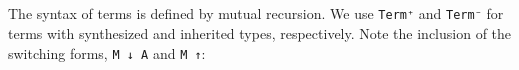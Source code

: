 \begin{fence}
\begin{code}%
\>[0]\AgdaSpace{}%
\AgdaSymbol{:}\AgdaSpace{}%
\<%
\\
\>[0]\AgdaSpace{}%
\AgdaSymbol{=}\AgdaSpace{}%
\<%
\\
%
\\[\AgdaEmptyExtraSkip]%
\>[0]\AgdaSpace{}%
\AgdaSpace{}%
\AgdaSymbol{:}\AgdaSpace{}%
\AgdaSpace{}%
\<%
\\
\>[0][@{}l@{\AgdaIndent{0}}]%
\>[2]%
\>[8]\AgdaSymbol{:}\AgdaSpace{}%
\<%
\\
%
\>[2]%
\>[8]\AgdaSymbol{:}\AgdaSpace{}%
\AgdaSpace{}%
\AgdaSpace{}%
\AgdaSpace{}%
\AgdaSpace{}%
\<%
\\
%
\\[\AgdaEmptyExtraSkip]%
\>[0]\AgdaSpace{}%
\AgdaSpace{}%
\AgdaSymbol{:}\AgdaSpace{}%
\AgdaSpace{}%
\<%
\\
\>[0][@{}l@{\AgdaIndent{0}}]%
\>[2]%
\>[8]\AgdaSymbol{:}\AgdaSpace{}%
\<%
\\
%
\>[2]\AgdaSpace{}%
\AgdaSymbol{:}\AgdaSpace{}%
\AgdaSpace{}%
\AgdaSpace{}%
\AgdaSpace{}%
\AgdaSpace{}%
\AgdaSpace{}%
\AgdaSpace{}%
\<%
\end{code}
\end{fence}

The syntax of terms is defined by mutual recursion. We use
\texttt{Term⁺} and \texttt{Term⁻} for terms with synthesized and
inherited types, respectively. Note the inclusion of the switching
forms, \texttt{M\ ↓\ A} and \texttt{M\ ↑}:

